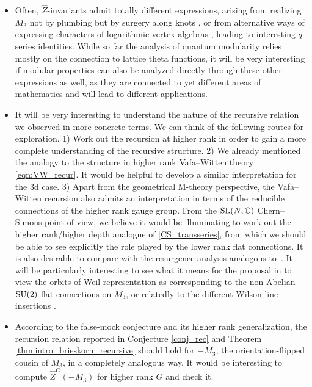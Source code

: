 \documentclass[10pt,a4paper]{amsart}
\theoremstyle{definition}
\numberwithin{equation}{section}
\begin{document}
\begin{itemize}
 \item Often, $\widehat Z$-invariants admit totally different expressions, arising from realizing $M_3$ not by plumbing but by surgery along knots \cite{Chung:2022ypb, Ekholm:2021irc, Ekholm:2020lqy,gukov2019two, Park:2019xey}, %
     or from alternative ways of expressing characters of logarithmic vertex algebras \cite{chengUpC}, leading to interesting $q$-series identities. While so far the analysis of quantum modularity relies mostly on the connection to lattice theta functions, it will be very interesting if modular properties can also be analyzed
 directly through these other expressions as well, as they are connected to yet different areas of mathematics and will lead to different applications.
 \item It will be very interesting to understand the nature of the recursive relation we observed in more concrete terms. We can think of the following routes for exploration. 1) Work out the recursion at higher rank in order to gain a more complete understanding of the recursive structure. 2) We already mentioned the analogy to the structure in higher rank Vafa--Witten theory \eqref{eqn:VW_recur}. It would be helpful to develop a similar interpretation for the 3d case. 3) Apart from the geometrical M-theory perspective, the Vafa--Witten recursion also admits an interpretation in terms of the reducible connections of the higher rank gauge group. From the ${\rm SL}(N,\mathbb C)$ Chern--Simons point of view, we believe it would be illuminating to work out the higher rank/higher depth analogue of \eqref{CS_transseries}, from which we should be able to see explicitly the role played by the lower rank flat connections. It is also desirable to compare with the resurgence analysis analogous to~\cite{Gukov:2016njj}. It will be particularly interesting to see what it means for the proposal in \cite{cheng20193d} to view the orbits of Weil representation as corresponding to the non-Abelian ${\rm SU}(2)$ flat connections on $M_3$, or relatedly to the different Wilson line insertions \cite{Gukov:2016gkn}. %
 \item According to the false-mock conjecture \cite{cheng20193d} %
  and its higher rank generalization, the recursion relation reported in Conjecture \ref{conj_rec} and Theorem \ref{thm:intro_brieskorn_recursive} should hold for $-M_3$, the orientation-flipped cousin of $M_3$, in a completely analogous way. It would be interesting to compute $\hat Z^G(-M_3)$ for higher rank $G$ and check it.
\end{itemize}
\end{document}
